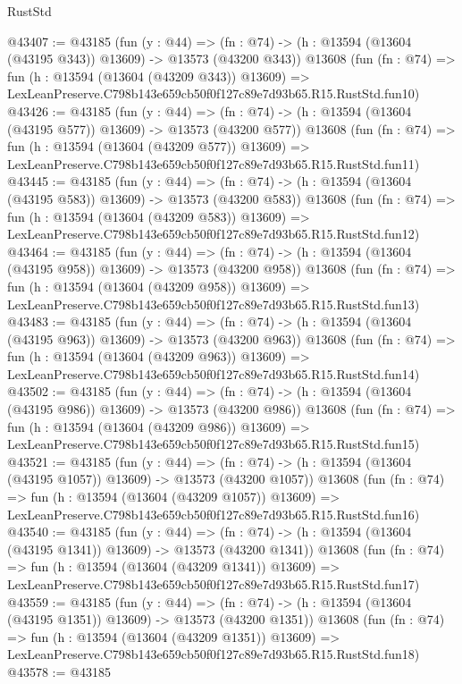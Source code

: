 \begin{lexlean}{RustStd}
\begin{coremodule}
@43407 := @43185
    (fun (y : @44) =>
    (fn : @74) -> (h : @13594 (@13604 (@43195 @343)) @13609) -> @13573 (@43200 @343))
    @13608
    (fun (fn : @74) =>
    fun (h : @13594 (@13604 (@43209 @343)) @13609) =>
    LexLeanPreserve.C798b143e659cb50f0f127c89e7d93b65.R15.RustStd.fun10)
@43426 := @43185
    (fun (y : @44) =>
    (fn : @74) -> (h : @13594 (@13604 (@43195 @577)) @13609) -> @13573 (@43200 @577))
    @13608
    (fun (fn : @74) =>
    fun (h : @13594 (@13604 (@43209 @577)) @13609) =>
    LexLeanPreserve.C798b143e659cb50f0f127c89e7d93b65.R15.RustStd.fun11)
@43445 := @43185
    (fun (y : @44) =>
    (fn : @74) -> (h : @13594 (@13604 (@43195 @583)) @13609) -> @13573 (@43200 @583))
    @13608
    (fun (fn : @74) =>
    fun (h : @13594 (@13604 (@43209 @583)) @13609) =>
    LexLeanPreserve.C798b143e659cb50f0f127c89e7d93b65.R15.RustStd.fun12)
@43464 := @43185
    (fun (y : @44) =>
    (fn : @74) -> (h : @13594 (@13604 (@43195 @958)) @13609) -> @13573 (@43200 @958))
    @13608
    (fun (fn : @74) =>
    fun (h : @13594 (@13604 (@43209 @958)) @13609) =>
    LexLeanPreserve.C798b143e659cb50f0f127c89e7d93b65.R15.RustStd.fun13)
@43483 := @43185
    (fun (y : @44) =>
    (fn : @74) -> (h : @13594 (@13604 (@43195 @963)) @13609) -> @13573 (@43200 @963))
    @13608
    (fun (fn : @74) =>
    fun (h : @13594 (@13604 (@43209 @963)) @13609) =>
    LexLeanPreserve.C798b143e659cb50f0f127c89e7d93b65.R15.RustStd.fun14)
@43502 := @43185
    (fun (y : @44) =>
    (fn : @74) -> (h : @13594 (@13604 (@43195 @986)) @13609) -> @13573 (@43200 @986))
    @13608
    (fun (fn : @74) =>
    fun (h : @13594 (@13604 (@43209 @986)) @13609) =>
    LexLeanPreserve.C798b143e659cb50f0f127c89e7d93b65.R15.RustStd.fun15)
@43521 := @43185
    (fun (y : @44) =>
    (fn : @74) -> (h : @13594 (@13604 (@43195 @1057)) @13609) -> @13573 (@43200 @1057))
    @13608
    (fun (fn : @74) =>
    fun (h : @13594 (@13604 (@43209 @1057)) @13609) =>
    LexLeanPreserve.C798b143e659cb50f0f127c89e7d93b65.R15.RustStd.fun16)
@43540 := @43185
    (fun (y : @44) =>
    (fn : @74) -> (h : @13594 (@13604 (@43195 @1341)) @13609) -> @13573 (@43200 @1341))
    @13608
    (fun (fn : @74) =>
    fun (h : @13594 (@13604 (@43209 @1341)) @13609) =>
    LexLeanPreserve.C798b143e659cb50f0f127c89e7d93b65.R15.RustStd.fun17)
@43559 := @43185
    (fun (y : @44) =>
    (fn : @74) -> (h : @13594 (@13604 (@43195 @1351)) @13609) -> @13573 (@43200 @1351))
    @13608
    (fun (fn : @74) =>
    fun (h : @13594 (@13604 (@43209 @1351)) @13609) =>
    LexLeanPreserve.C798b143e659cb50f0f127c89e7d93b65.R15.RustStd.fun18)
@43578 := @43185

\end{coremodule}
\end{lexlean}
